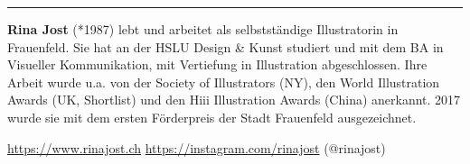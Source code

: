 \begin{center}\rule{0.5\linewidth}{0.5pt}\end{center}

\textbf{Rina Jost} (*1987) lebt und arbeitet als selbstständige
Illustratorin in Frauenfeld. Sie hat an der HSLU Design \& Kunst
studiert und mit dem BA in Visueller Kommunikation, mit Vertiefung in
Illustration abgeschlossen. Ihre Arbeit wurde u.a. von der Society of
Illustrators (NY), den World Illustration Awards (UK, Shortlist) und den
Hiii Illustration Awards (China) anerkannt. 2017 wurde sie mit dem
ersten Förderpreis der Stadt Frauenfeld ausgezeichnet.

\url{https://www.rinajost.ch} \textbar{}
\url{https://instagram.com/rinajost} (@rinajost)
